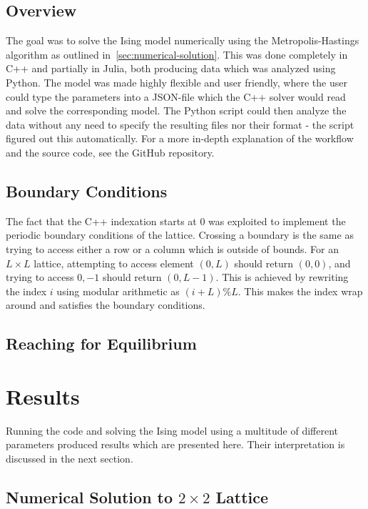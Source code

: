 \documentclass[aps,reprint]{revtex4-1}
\begin{document}
\subsection{Overview}
\label{sec:overview}


The goal was to solve the Ising model numerically using the Metropolis-Hastings
algorithm as outlined in~\ref{sec:numerical-solution}. This was done completely
in C++ and partially in Julia, both producing data which was analyzed using
Python. The model was made highly flexible and user friendly, where the user could
type the parameters into a JSON-file which the C++ solver would read and solve
the corresponding model.
The Python script could then analyze the data without any need to specify the
resulting files nor their format - the script figured out this automatically.
For a more in-depth explanation of the workflow and the source code, see the
GitHub repository.

\subsection{Boundary Conditions}
\label{sec:boundary-conditions}

The fact that the C++ indexation starts at \(0\) was exploited to implement the
periodic boundary conditions of the lattice. Crossing a boundary is the same as
trying to access either a row or a column which is outside of bounds. For an
\(L\times L\) lattice, attempting to access element \((0, L)\) should return
\((0,0)\), and trying to access \(0, -1\) should return \((0, L-1)\). This is
achieved by rewriting the index \(i\) using modular arithmetic as \((i+L) \%
L\). This makes the index wrap around and satisfies the boundary conditions.

\subsection{Reaching for Equilibrium}
\label{sec:reaching-equilibrium-1}


\section{Results}
\label{sec:results}

Running the code and solving the Ising model using a multitude of different
parameters produced results which are presented here. Their interpretation is
discussed in the next section.

\subsection{Numerical Solution to $2\times 2$ Lattice}
\label{sec:numer-solut-2tim}
\end{document}
